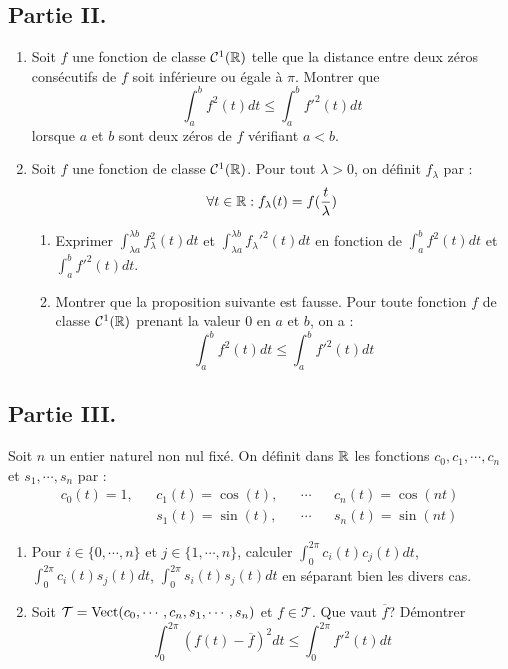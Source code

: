 \subsection*{Partie II.}
\begin{enumerate}
 \item Soit $f$ une fonction de classe ${\cal{C}}^{1}(\mathbb{R})$ telle que la distance entre deux zéros consécutifs de $f$ soit inférieure ou égale à $\pi$. Montrer que
\begin{displaymath}
  \int_a^bf^2(t)dt \leq  \int_a^bf'^2(t)dt 
\end{displaymath}
lorsque $a$ et $b$ sont deux zéros de $f$ vérifiant $a<b$.
\item Soit $f$ une fonction de classe ${\cal{C}}^{1}(\mathbb{R})$. Pour tout $\lambda>0$, on définit $f_\lambda$ par :
\begin{displaymath}
\forall t \in \mathbb{R} : f_\lambda(t) = f(\dfrac{t}{\lambda})
\end{displaymath}
\begin{enumerate}
 \item Exprimer $\int_{\lambda a}^{\lambda b}f_\lambda^2(t)dt$ et $\int_{\lambda a}^{\lambda b}{f_\lambda}'^2(t)dt$ 
en fonction de $ \int_a^bf^2(t)dt$ et $\int_a^bf'^2(t)dt$.
\item Montrer que la proposition suivante est fausse.\newline
Pour toute fonction $f$ de classe ${\cal{C}}^{1}(\mathbb{R})$ prenant la valeur $0$ en $a$ et $b$, on a :
\begin{displaymath}
  \int_a^bf^2(t)dt \leq  \int_a^bf'^2(t)dt 
\end{displaymath}
\end{enumerate}

\end{enumerate}


\subsection*{Partie III.}
Soit $n$ un entier naturel non nul fixé. On définit dans $\mathbb{R}$ les fonctions $c_0,c_1, \cdots, c_n$ et $s_1,\cdots,s_n$ par :
\begin{align*}
 c_0(t)= 1, & & c_1(t) = \cos(t), & & \cdots & & c_n(t) = \cos(nt) \\  
            & & s_1(t) = \sin(t), & & \cdots & &  s_n(t)= \sin(nt)
\end{align*}
\begin{enumerate}
 \item Pour $i\in\{0,\cdots,n\}$ et $j\in\{1,\cdots,n\}$, calculer $\int_{0}^{2\pi}c_i(t)c_j(t)dt$, $\int_{0}^{2\pi}c_i(t)s_j(t)dt$, $\int_{0}^{2\pi}s_i(t)s_j(t)dt$ en séparant bien les divers cas.
\item Soit $\mathcal T = \operatorname{Vect}(c_0,\cdots,c_n,s_1,\cdots,s_n)$ et $f\in \mathcal T$. Que vaut $\overline{f}$? Démontrer 
\begin{displaymath}
 \int_{0}^{2\pi}(f(t)-\overline{f})^2dt \leq \int_{0}^{2\pi}f'^2(t)dt
\end{displaymath}
\end{enumerate}

